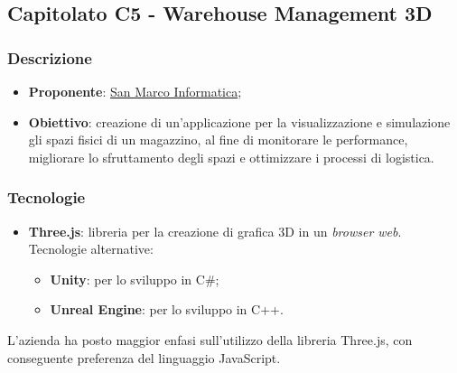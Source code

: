 \subsection{Capitolato C5 - Warehouse Management 3D}


\subsubsection{Descrizione}
\begin{itemize}
    \item \textbf{Proponente}: \href{https://www.sanmarcoinformatica.com/}{San Marco Informatica};
    \item \textbf{Obiettivo}:  creazione di un'applicazione per la visualizzazione e simulazione gli spazi fisici di un magazzino, al fine di monitorare le performance, migliorare lo sfruttamento degli spazi e ottimizzare i processi di logistica.
\end{itemize}


\subsubsection{Tecnologie}
\begin{itemize}
    \item \textbf{Three.js}: libreria per la creazione di grafica 3D in un \textit{browser web}. Tecnologie alternative:
        \begin{itemize}
            \item \textbf{Unity}: per lo sviluppo in C\#;
	        \item \textbf{Unreal Engine}: per lo sviluppo in C++.
        \end{itemize}
\end{itemize}
L'azienda ha posto maggior enfasi sull'utilizzo della libreria Three.js, con conseguente preferenza del linguaggio JavaScript.


